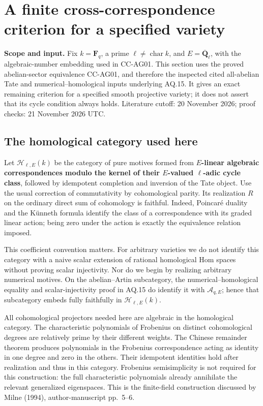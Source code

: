 \documentclass[11pt,a4paper]{article}
\theoremstyle{definition}\newtheorem{definition}[theorem]{Definition}
\theoremstyle{remark}\newtheorem{remark}[theorem]{Remark}
\begin{document}

\section{A finite cross-correspondence criterion for a specified
variety}\label{a-finite-cross-correspondence-criterion-for-a-specified-variety}

\textbf{Scope and input.} Fix \(k=\mathbf F_q\), a prime
\(\ell\ne\operatorname{char}k\), and \(E=\overline{\mathbf Q}_\ell\),
with the algebraic-number embedding used in CC-AG01. This section uses
the proved abelian-sector equivalence CC-AG01, and therefore the
inspected cited all-abelian Tate and numerical--homological inputs
underlying AQ.15. It gives an exact remaining criterion for a specified
smooth projective variety; it does not assert that its cycle condition
always holds. Literature cutoff: 20 November 2026; proof checks: 21
November 2026 UTC.

\subsection{The homological category used
here}\label{the-homological-category-used-here}

Let \(\mathcal H_{\ell,E}(k)\) be the category of pure motives formed
from \textbf{\(E\)-linear algebraic correspondences modulo the kernel of
their \(E\)-valued \(\ell\)-adic cycle class}, followed by idempotent
completion and inversion of the Tate object. Use the usual correction of
commutativity by cohomological parity. Its realization \(R\) on the
ordinary direct sum of cohomology is faithful. Indeed, Poincaré duality
and the Künneth formula identify the class of a correspondence with its
graded linear action; being zero under the action is exactly the
equivalence relation imposed.

This coefficient convention matters. For arbitrary varieties we do not
identify this category with a naive scalar extension of rational
homological Hom spaces without proving scalar injectivity. Nor do we
begin by realizing arbitrary numerical motives. On the abelian--Artin
subcategory, the numerical--homological equality and scalar-injectivity
proof in AQ.15 do identify it with \(\mathcal A_{q,E}\); hence that
subcategory embeds fully faithfully in \(\mathcal H_{\ell,E}(k)\).

All cohomological projectors needed here are algebraic in the
homological category. The characteristic polynomials of Frobenius on
distinct cohomological degrees are relatively prime by their different
weights. The Chinese remainder theorem produces polynomials in the
Frobenius correspondence acting as identity in one degree and zero in
the others. Their idempotent identities hold after realization and thus
in this category. Frobenius semisimplicity is not required for this
construction: the full characteristic polynomials already annihilate the
relevant generalized eigenspaces. This is the finite-field construction
discussed by Milne (1994), author-manuscript pp.~5--6.
\end{document}
